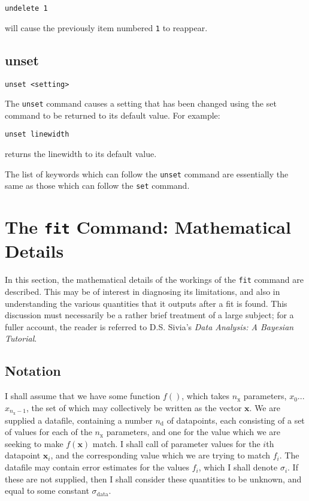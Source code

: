 \documentclass[a4paper,onecolumn,11pt]{book}
\begin{document}
\begin{verbatim}
undelete 1
\end{verbatim}

\noindent will cause the previously item numbered {\tt 1} to reappear.
  
\section{unset}

\begin{verbatim}
unset <setting>
\end{verbatim}

The {\tt unset} command causes a setting that has been changed using the set
command to be returned to its default value.  For example:

\begin{verbatim}
unset linewidth
\end{verbatim}

\noindent returns the linewidth to its default value.

The list of keywords which can follow the {\tt unset} command are essentially
the same as those which can follow the {\tt set} command.

\chapter{The \texttt{fit} Command: Mathematical Details}
\label{fit_math}

In this section, the mathematical details of the workings of the \texttt{fit}
command are described. This may be of interest in diagnosing its limitations,
and also in understanding the various quantities that it outputs after a fit is
found. This discussion must necessarily be a rather brief treatment of a large
subject; for a fuller account, the reader is referred to D.S. Sivia's
\textit{Data Analysis: A Bayesian Tutorial}.

\section{Notation}
\label{bayes_notation}

I shall assume that we have some function $f()$, which takes $n_\mathrm{x}$
parameters, $x_0$...$x_{n_\mathrm{x}-1}$, the set of which may collectively be
written as the vector $\mathbf{x}$. We are supplied a datafile, containing a
number $n_\mathrm{d}$ of datapoints, each consisting of a set of values for
each of the $n_\mathrm{x}$ parameters, and one for the value which we are
seeking to make $f(\mathbf{x})$ match. I shall call of parameter values for the
$i$th datapoint $\mathbf{x}_i$, and the corresponding value which we are trying
to match $f_i$. The datafile may contain error estimates for the values $f_i$,
which I shall denote $\sigma_i$. If these are not supplied, then I shall
consider these quantities to be unknown, and equal to some constant
$\sigma_\mathrm{data}$.
\end{document}
